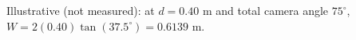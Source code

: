 Illustrative (not measured): at $d=0.40$ m and total camera angle $75^\circ$, $W=2(0.40)\tan(37.5^\circ)=0.6139$ m.
